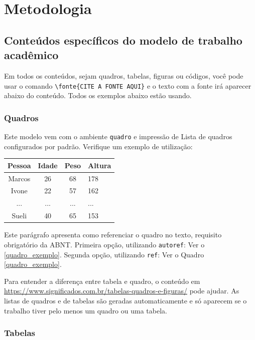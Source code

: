 \chapter{Metodologia}

\section{Conteúdos específicos do modelo de trabalho acadêmico}

Em todos os conteúdos, sejam quadros, tabelas, figuras ou códigos, você pode usar o comando \verb|\fonte{CITE A FONTE AQUI}| e o texto com a fonte irá aparecer abaixo do conteúdo. Todos os exemplos abaixo estão usando.

\subsection{Quadros}

Este modelo vem com o ambiente \texttt{quadro} e impressão de Lista de quadros configurados por padrão. Verifique um exemplo de utilização:

\begin{quadro}[htb]
\caption{\label{quadro_exemplo}Exemplo de quadro}
\begin{tabular}{|c|c|c|p{3cm}|}
	\hline
	\textbf{Pessoa} & \textbf{Idade} & \textbf{Peso} & \textbf{Altura} \\ \hline
	Marcos & 26    & 68   & 178    \\ \hline
	Ivone  & 22    & 57   & 162    \\ \hline
	...    & ...   & ...  & ...    \\ \hline
	Sueli  & 40    & 65   & 153    \\ \hline
\end{tabular}
\end{quadro}

Este parágrafo apresenta como referenciar o quadro no texto, requisito obrigatório da ABNT.  Primeira opção, utilizando \texttt{autoref}: Ver o \autoref{quadro_exemplo}.  Segunda opção, utilizando  \texttt{ref}: Ver o Quadro \ref{quadro_exemplo}.

Para entender a diferença entre tabela e quadro, o conteúdo em \url{https://www.significados.com.br/tabelas-quadros-e-figuras/} pode ajudar. As listas de quadros e de tabelas são geradas automaticamente e só aparecem se o trabalho tiver pelo menos um quadro ou uma tabela.

\subsection{Tabelas}


